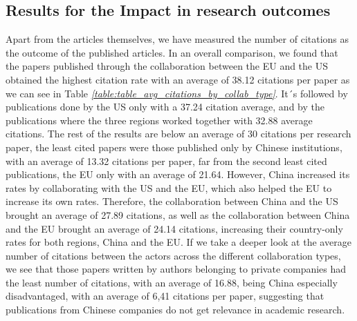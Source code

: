 \subsection{Results for the Impact in research outcomes}



Apart from the articles themselves, we have measured the number of citations as the outcome of the published articles. In an overall comparison, we found that the papers published through the collaboration between the EU and the US obtained the highest citation rate with an average of 38.12 citations per paper as we can see in Table \textit{\ref{table:table_avg_citations_by_collab_type}}. It´s followed by publications done by the US only with a 37.24 citation average, and by the publications where the three regions worked together with 32.88 average citations. The rest of the results are below an average of 30 citations per research paper, the least cited papers were those published only by Chinese institutions, with an average of 13.32 citations per paper, far from the second least cited publications, the EU only with an average of 21.64. However, China increased its rates by collaborating with the US and the EU, which also helped the EU to increase its own rates. Therefore, the collaboration between China and the US brought an average of 27.89 citations, as well as the collaboration between China and the EU brought an average of 24.14 citations, increasing their country-only rates for both regions, China and the EU. 
If we take a deeper look at the average number of citations between the actors across the different collaboration types, we see that those papers written by authors belonging to private companies had the least number of citations, with an average of 16.88, being China especially disadvantaged, with an average of 6,41 citations per paper, suggesting that publications from Chinese companies do not get relevance in academic research.



